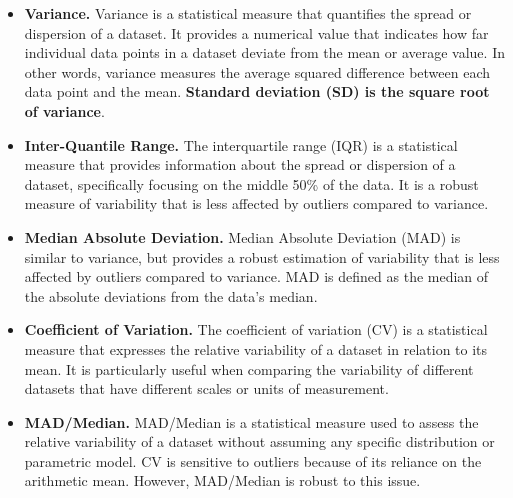 \documentclass[
]{article}
\begin{document}
\begin{itemize}
\item
  \textbf{Variance.} Variance is a statistical measure that quantifies the spread or dispersion of a dataset. It provides a numerical value that indicates how far individual data points in a dataset deviate from the mean or average value. In other words, variance measures the average squared difference between each data point and the mean. \textbf{Standard deviation (SD) is the square root of variance}.
\item
  \textbf{Inter-Quantile Range.} The interquartile range (IQR) is a statistical measure that provides information about the spread or dispersion of a dataset, specifically focusing on the middle 50\% of the data. It is a robust measure of variability that is less affected by outliers compared to variance.
\item
  \textbf{Median Absolute Deviation.} Median Absolute Deviation (MAD) is similar to variance, but provides a robust estimation of variability that is less affected by outliers compared to variance. MAD is defined as the median of the absolute deviations from the data's median.
\item
  \textbf{Coefficient of Variation.} The coefficient of variation (CV) is a statistical measure that expresses the relative variability of a dataset in relation to its mean. It is particularly useful when comparing the variability of different datasets that have different scales or units of measurement.
\item
  \textbf{MAD/Median.} MAD/Median is a statistical measure used to assess the relative variability of a dataset without assuming any specific distribution or parametric model. CV is sensitive to outliers because of its reliance on the arithmetic mean. However, MAD/Median is robust to this issue.
\end{itemize}
\end{document}
